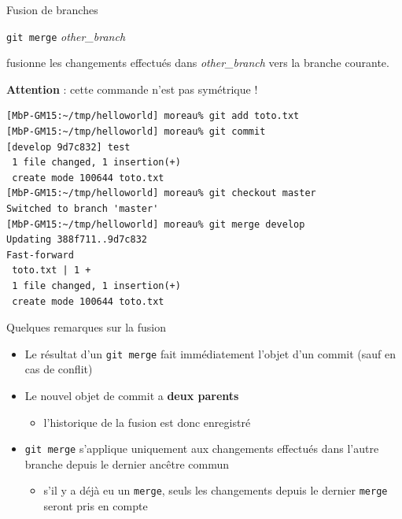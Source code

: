 \begin{frame}[fragile]{%
\protect\hypertarget{fusion-de-branches}{%
Fusion de branches}}

\texttt{git\ merge} \emph{other\_branch}

fusionne les changements effectués dans \emph{other\_branch} vers la
branche courante.

\alert{\textbf{Attention}} : cette commande n’est pas symétrique !

\begin{lstlisting}
[MbP-GM15:~/tmp/helloworld] moreau% git add toto.txt
[MbP-GM15:~/tmp/helloworld] moreau% git commit
[develop 9d7c832] test
 1 file changed, 1 insertion(+)
 create mode 100644 toto.txt
[MbP-GM15:~/tmp/helloworld] moreau% git checkout master
Switched to branch 'master'
[MbP-GM15:~/tmp/helloworld] moreau% git merge develop
Updating 388f711..9d7c832
Fast-forward
 toto.txt | 1 +
 1 file changed, 1 insertion(+)
 create mode 100644 toto.txt
\end{lstlisting}

\end{frame}

\begin{frame}[fragile]{%
\protect\hypertarget{quelques-remarques-sur-la-fusion}{%
Quelques remarques sur la fusion}}

\begin{itemize}
\tightlist
\item
  Le résultat d’un \texttt{git\ merge} fait immédiatement l’objet d’un
  commit (sauf en cas de conflit)
\item
  Le nouvel objet de commit a \textbf{deux parents}

  \begin{itemize}
  \tightlist
  \item
    l’historique de la fusion est donc enregistré
  \end{itemize}
\item
  \texttt{git\ merge} s’applique uniquement aux changements effectués
  dans l’autre branche depuis le dernier ancêtre commun

  \begin{itemize}
  \tightlist
  \item
    s’il y a déjà eu un \texttt{merge}, seuls les changements depuis le
    dernier \texttt{merge} seront pris en compte
  \end{itemize}
\end{itemize}

\end{frame}

